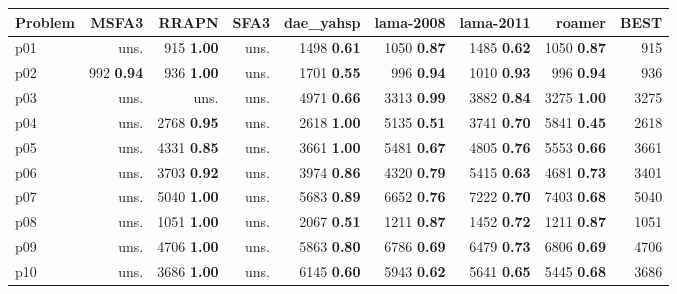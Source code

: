 \begin{tabular}{|l|rrrrrrr|r|}
\hline
\textbf{Problem} & \textbf{MSFA3} & \textbf{RRAPN} & \textbf{SFA3} & \textbf{dae\_yahsp} & \textbf{lama-2008} & \textbf{lama-2011} & \textbf{roamer} & \textbf{BEST}\\
\hline
p01 & uns. & {\footnotesize 915} \textbf{1.00} & uns. & {\footnotesize 1498} \textbf{0.61} & {\footnotesize 1050} \textbf{0.87} & {\footnotesize 1485} \textbf{0.62} & {\footnotesize 1050} \textbf{0.87} & 915\\
p02 & {\footnotesize 992} \textbf{0.94} & {\footnotesize 936} \textbf{1.00} & uns. & {\footnotesize 1701} \textbf{0.55} & {\footnotesize 996} \textbf{0.94} & {\footnotesize 1010} \textbf{0.93} & {\footnotesize 996} \textbf{0.94} & 936\\
p03 & uns. & uns. & uns. & {\footnotesize 4971} \textbf{0.66} & {\footnotesize 3313} \textbf{0.99} & {\footnotesize 3882} \textbf{0.84} & {\footnotesize 3275} \textbf{1.00} & 3275\\
p04 & uns. & {\footnotesize 2768} \textbf{0.95} & uns. & {\footnotesize 2618} \textbf{1.00} & {\footnotesize 5135} \textbf{0.51} & {\footnotesize 3741} \textbf{0.70} & {\footnotesize 5841} \textbf{0.45} & 2618\\
p05 & uns. & {\footnotesize 4331} \textbf{0.85} & uns. & {\footnotesize 3661} \textbf{1.00} & {\footnotesize 5481} \textbf{0.67} & {\footnotesize 4805} \textbf{0.76} & {\footnotesize 5553} \textbf{0.66} & 3661\\
p06 & uns. & {\footnotesize 3703} \textbf{0.92} & uns. & {\footnotesize 3974} \textbf{0.86} & {\footnotesize 4320} \textbf{0.79} & {\footnotesize 5415} \textbf{0.63} & {\footnotesize 4681} \textbf{0.73} & 3401\\
p07 & uns. & {\footnotesize 5040} \textbf{1.00} & uns. & {\footnotesize 5683} \textbf{0.89} & {\footnotesize 6652} \textbf{0.76} & {\footnotesize 7222} \textbf{0.70} & {\footnotesize 7403} \textbf{0.68} & 5040\\
p08 & uns. & {\footnotesize 1051} \textbf{1.00} & uns. & {\footnotesize 2067} \textbf{0.51} & {\footnotesize 1211} \textbf{0.87} & {\footnotesize 1452} \textbf{0.72} & {\footnotesize 1211} \textbf{0.87} & 1051\\
p09 & uns. & {\footnotesize 4706} \textbf{1.00} & uns. & {\footnotesize 5863} \textbf{0.80} & {\footnotesize 6786} \textbf{0.69} & {\footnotesize 6479} \textbf{0.73} & {\footnotesize 6806} \textbf{0.69} & 4706\\
p10 & uns. & {\footnotesize 3686} \textbf{1.00} & uns. & {\footnotesize 6145} \textbf{0.60} & {\footnotesize 5943} \textbf{0.62} & {\footnotesize 5641} \textbf{0.65} & {\footnotesize 5445} \textbf{0.68} & 3686\\

\end{tabular}
